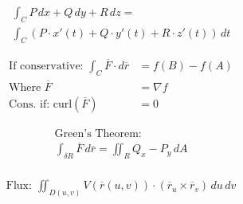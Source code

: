 \documentclass[12pt]{article}
\begin{document}
\vspace{-30pt}

\begin{multicols}{2}

  \begin{equation*}
    \begin{split}
      \int_C P\,dx + Q\,dy + R\,dz =\\
      \int_C (P\cdot x'(t) + Q\cdot y'(t) + R\cdot z'(t))\,dt
    \end{split}
  \end{equation*}

  \begin{equation*}
    \begin{split}
      \text{If conservative: }\int_C \overline{F}\cdot d\overline{r}&=f(B)-f(A)\\
      \text{Where }\overline{F}&=\nabla f\\
      \text{Cons. if: curl}(\overline{F})&=0
    \end{split}
  \end{equation*}

\end{multicols}

\vspace{-30pt}

\begin{multicols}{2}

  \begin{equation*}
    \begin{split}
      \text{Green's Theorem:}\\
      \int_{\delta R}\overline{F}\,d\overline{r}=\iint_R Q_x-P_y\,dA\\
    \end{split}
  \end{equation*}

  \begin{equation*}
    \begin{split}
      \text{Flux: }\iint_{D(u,v)}V(\overline{r}(u,v))\cdot(\overline{r}_u\times\overline{r}_v)\,du\,dv\\
    \end{split}
  \end{equation*}

\end{multicols}

\vspace{-30pt}
\end{document}
